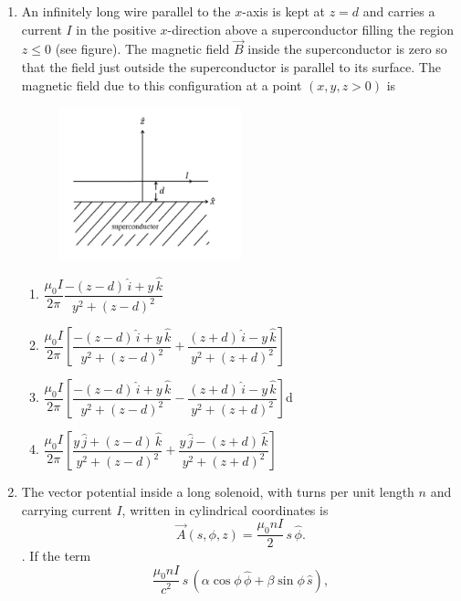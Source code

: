 \documentclass[journal,12pt,onecolumn]{IEEEtran}
\begin{document}
\begin{enumerate}[itemsep=0.45cm]
\newpage

\item An infinitely long wire parallel to the $x$-axis is kept at $z=d$ and carries a current $I$ in the positive $x$-direction above a superconductor filling the region $z \leq 0$ (see figure). The magnetic field $\vec{B}$ inside the superconductor is zero so that the field just outside the superconductor is parallel to its surface. The magnetic field due to this configuration at a point $(x, y, z>0)$ is

\begin{figure}[ht!]
    \centering
    \includegraphics[width=0.5\textwidth]{fig13.jpeg}
    \caption{}
    \label{fig:fig13.jpeg}
\end{figure}

\hfill{}



    \begin{enumerate}
        \item $\dfrac{\mu_{0} I}{2\pi} \dfrac{-(z-d)\,\hat{i}+y\,\hat{k}}{y^{2}+(z-d)^{2}}$
        \item $\dfrac{\mu_{0} I}{2\pi} \left[\dfrac{-(z-d)\,\hat{i}+y\,\hat{k}}{y^{2}+(z-d)^{2}} + \dfrac{(z+d)\,\hat{i}-y\,\hat{k}}{y^{2}+(z+d)^{2}}\right]$
        \item $\dfrac{\mu_{0} I}{2\pi} \left[\dfrac{-(z-d)\,\hat{i}+y\,\hat{k}}{y^{2}+(z-d)^{2}} - \dfrac{(z+d)\,\hat{i}-y\,\hat{k}}{y^{2}+(z+d)^{2}}\right]$d
        \item $\dfrac{\mu_{0} I}{2\pi} \left[\dfrac{y\,\hat{j}+(z-d)\,\hat{k}}{y^{2}+(z-d)^{2}} + \dfrac{y\,\hat{j}-(z+d)\,\hat{k}}{y^{2}+(z+d)^{2}}\right]$
    \end{enumerate}
    
    \item The vector potential inside a long solenoid, with turns per unit length $n$ and carrying current $I$, written in cylindrical coordinates is   \[\vec{A}(s,\phi,z) = \frac{\mu_{0} n I}{2}\,s\,\hat{\phi}. \]. If the term\[\frac{\mu_{0} n I}{c^{2}}\,s \,(\alpha \cos\phi\,\hat{\phi} + \beta \sin\phi\,\hat{s}), \] 
   

\end{enumerate}
\end{document}
